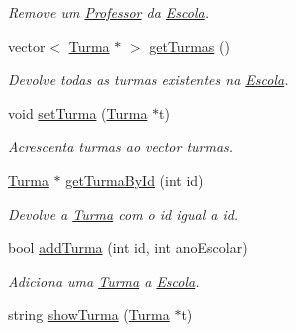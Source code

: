 \begin{DoxyCompactItemize}
\begin{DoxyCompactList}\small\item\em Remove um \hyperlink{class_professor}{Professor} da \hyperlink{class_escola}{Escola}. \end{DoxyCompactList}\item 
\hypertarget{class_escola_acee757e16892f33820b22a7d7749d97d}{vector$<$ \hyperlink{class_turma}{Turma} $\ast$ $>$ \hyperlink{class_escola_acee757e16892f33820b22a7d7749d97d}{get\-Turmas} ()}\label{class_escola_acee757e16892f33820b22a7d7749d97d}

\begin{DoxyCompactList}\small\item\em Devolve todas as turmas existentes na \hyperlink{class_escola}{Escola}. \end{DoxyCompactList}\item 
\hypertarget{class_escola_a75635f871c420f3d1373285b1e773ce8}{void \hyperlink{class_escola_a75635f871c420f3d1373285b1e773ce8}{set\-Turma} (\hyperlink{class_turma}{Turma} $\ast$t)}\label{class_escola_a75635f871c420f3d1373285b1e773ce8}

\begin{DoxyCompactList}\small\item\em Acrescenta turmas ao vector turmas. \end{DoxyCompactList}\item 
\hypertarget{class_escola_a5dab98b3f36b81a764b104d9d9a302e8}{\hyperlink{class_turma}{Turma} $\ast$ \hyperlink{class_escola_a5dab98b3f36b81a764b104d9d9a302e8}{get\-Turma\-By\-Id} (int id)}\label{class_escola_a5dab98b3f36b81a764b104d9d9a302e8}

\begin{DoxyCompactList}\small\item\em Devolve a \hyperlink{class_turma}{Turma} com o id igual a id. \end{DoxyCompactList}\item 
\hypertarget{class_escola_a86d547f74fe935bfd8bdf3cd35d25860}{bool \hyperlink{class_escola_a86d547f74fe935bfd8bdf3cd35d25860}{add\-Turma} (int id, int ano\-Escolar)}\label{class_escola_a86d547f74fe935bfd8bdf3cd35d25860}

\begin{DoxyCompactList}\small\item\em Adiciona uma \hyperlink{class_turma}{Turma} a \hyperlink{class_escola}{Escola}. \end{DoxyCompactList}\item 
\hypertarget{class_escola_a91096932c5326cb2e5c30cbd860c126c}{string \hyperlink{class_escola_a91096932c5326cb2e5c30cbd860c126c}{show\-Turma} (\hyperlink{class_turma}{Turma} $\ast$t)}\label{class_escola_a91096932c5326cb2e5c30cbd860c126c}


\end{DoxyCompactItemize}

